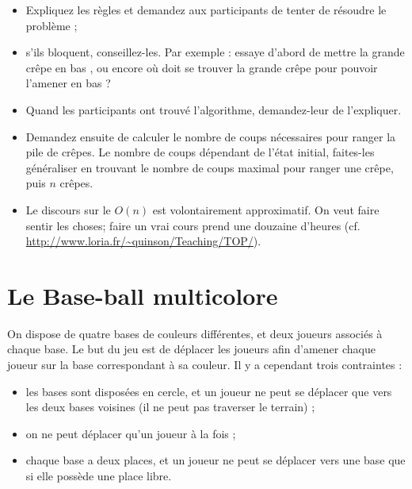 \documentclass[a5paper,pagesize,DIV=14]{scrbook}
\begin{document}
\begin{itemize}
\item Expliquez les règles et demandez aux participants de tenter de résoudre le
  problème ;
\item s'ils bloquent, conseillez-les. Par exemple : \og essaye d'abord de mettre
  la grande crêpe en bas \fg, ou encore \og où doit se trouver la grande crêpe
  pour pouvoir l'amener en bas ? \fg
\item Quand les participants ont trouvé l'algorithme, demandez-leur de
  l'expliquer.
\item Demandez ensuite de calculer le nombre de coups nécessaires pour ranger la
  pile de crêpes. Le nombre de coups dépendant de l'état initial, faites-les
  généraliser en trouvant le nombre de coups maximal pour ranger une crêpe, puis
  $n$ crêpes.
\item Le discours sur le $O(n)$ est volontairement approximatif. On veut faire
  sentir les choses; faire un vrai cours prend une douzaine d'heures
  (cf. \url{http://www.loria.fr/~quinson/Teaching/TOP/}).
\end{itemize}
\chapter*{Le Base-ball multicolore}

On dispose de quatre bases de couleurs différentes, et deux joueurs associés à
chaque base. Le but du jeu est de déplacer les joueurs afin d'amener chaque
joueur sur la base correspondant à sa couleur. Il y a cependant trois
contraintes :

\begin{itemize}
\item les bases sont disposées en cercle, et un joueur ne peut se déplacer que
  vers les deux bases voisines (il ne peut pas traverser le terrain) ;
\item on ne peut déplacer qu'un joueur à la fois ;
\item chaque base a deux places, et un joueur ne peut se déplacer vers une base
  que si elle possède une place libre.
\end{itemize}
\end{document}
